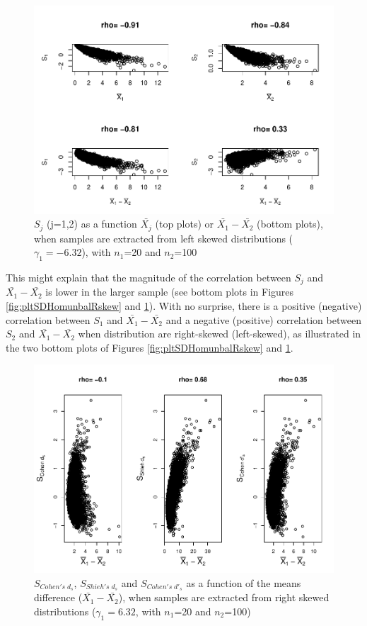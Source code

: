 \documentclass[
  man]{apa6}
\begin{document}
\begin{figure}
\centering
\includegraphics{Correlation_files/figure-latex/pltSDHomunbalLskew-1.pdf}
\caption{\label{fig:pltSDHomunbalLskew}\(S_j\) (j=1,2) as a function \(\bar{X_j}\) (top plots) or \(\bar{X_1}-\bar{X_2}\) (bottom plots), when samples are extracted from left skewed distributions (\(\gamma_1 = -6.32\)), with \(n_1\)=20 and \(n_2\)=100}
\end{figure}

This might explain that the magnitude of the correlation between \(S_j\) and \(\bar{X_1}-\bar{X_2}\) is lower in the larger sample (see bottom plots in Figures \ref{fig:pltSDHomunbalRskew} and \ref{fig:pltSDHomunbalLskew}). With no surprise, there is a positive (negative) correlation between \(S_1\) and \(\bar{X_1}-\bar{X_2}\) and a negative (positive) correlation between \(S_2\) and \(\bar{X_1}-\bar{X_2}\) when distribution are right-skewed (left-skewed), as illustrated in the two bottom plots of Figures \ref{fig:pltSDHomunbalRskew} and \ref{fig:pltSDHomunbalLskew}.

\begin{figure}
\centering
\includegraphics{Correlation_files/figure-latex/pltStdzrHomunbalRskew-1.pdf}
\caption{\label{fig:pltStdzrHomunbalRskew}\(S_{Cohen's \; d_s}\), \(S_{Shieh's \; d_s}\) and \(S_{Cohen's \; d'_s}\) as a function of the means difference (\(\bar{X_1}-\bar{X_2}\)), when samples are extracted from right skewed distributions (\(\gamma_1 = 6.32\), with \(n_1\)=20 and \(n_2\)=100)}
\end{figure}
\end{document}
